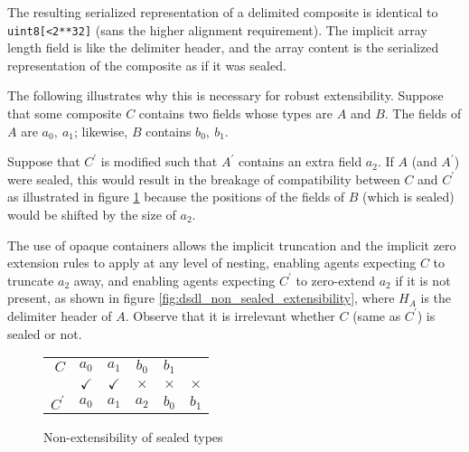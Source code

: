 \begin{remark}
    The resulting serialized representation of a delimited composite is identical to \verb|uint8[<2**32]|
    (sans the higher alignment requirement).
    The implicit array length field is like the delimiter header,
    and the array content is the serialized representation of the composite as if it was sealed.

    The following illustrates why this is necessary for robust extensibility.
    Suppose that some composite $C$ contains two fields whose types are $A$ and $B$.
    The fields of $A$ are $a_0,\ a_1$;
    likewise, $B$ contains $b_0,\ b_1$.

    Suppose that $C^\prime$ is modified such that $A^\prime$ contains an extra field $a_2$.
    If $A$ (and $A^\prime$) were sealed, this would result in the breakage of compatibility between $C$ and $C^\prime$
    as illustrated in figure \ref{fig:dsdl_sealed_non_extensibility} because the positions of the fields of $B$
    (which is sealed) would be shifted by the size of $a_2$.

    The use of opaque containers allows the implicit truncation and the implicit zero extension rules to apply
    at any level of nesting, enabling agents expecting $C$ to truncate $a_2$ away,
    and enabling agents expecting $C^\prime$ to zero-extend $a_2$
    if it is not present, as shown in figure \ref{fig:dsdl_non_sealed_extensibility},
    where $H_A$ is the delimiter header of $A$.
    Observe that it is irrelevant whether $C$ (same as $C^\prime$) is sealed or not.

    \begin{figure}[H]
        \centering
        \begin{tabular}{r c c c c c}
            \cline{2-5}
            $C$ &
            \multicolumn{1}{|c|}{$a_0$} & \multicolumn{1}{c|}{$a_1$}
            &\multicolumn{1}{c|}{$b_0$} & \multicolumn{1}{c|}{$b_1$} &
            \\\cline{2-5}
            & $\checkmark$ & $\checkmark$ & $\times$ & $\times$ & $\times$ \\
            \cline{2-6}
            $C^\prime$ &
            \multicolumn{1}{|c|}{$a_0$} & \multicolumn{1}{c|}{$a_1$} & \multicolumn{1}{c|}{$a_2$}
            &\multicolumn{1}{c|}{$b_0$} & \multicolumn{1}{c|}{$b_1$}
            \\\cline{2-6}
        \end{tabular}
        \caption{Non-extensibility of sealed types}
        \label{fig:dsdl_sealed_non_extensibility}
    \end{figure}


\end{remark}
